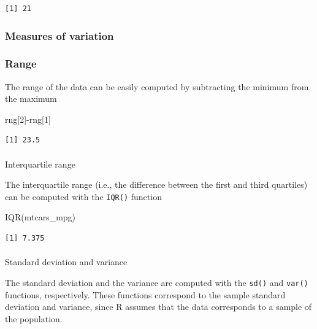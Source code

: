 \documentclass[
  letterpaper,
  DIV=11,
  numbers=noendperiod]{scrartcl}
\makeatletter
\let\oldparagraph\paragraph
\renewcommand{\paragraph}{
    \@ifstar
      \xxxParagraphStar
      \xxxParagraphNoStar
  }
\newcommand{\xxxParagraphStar}[1]{\oldparagraph*{#1}\mbox{}}
\newcommand{\xxxParagraphNoStar}[1]{\oldparagraph{#1}\mbox{}}
\newenvironment{Shaded}{\begin{snugshade}}{\end{snugshade}}
\newcommand{\DecValTok}[1]{\textcolor[rgb]{0.68,0.00,0.00}{#1}}
\newcommand{\FunctionTok}[1]{\textcolor[rgb]{0.28,0.35,0.67}{#1}}
\newcommand{\NormalTok}[1]{\textcolor[rgb]{0.00,0.23,0.31}{#1}}
\newcommand{\SpecialCharTok}[1]{\textcolor[rgb]{0.37,0.37,0.37}{#1}}
\makeatother
\begin{document}
\begin{verbatim}
[1] 21
\end{verbatim}

\subsubsection{Measures of variation}\label{measures-of-variation}

\subsubsection{Range}\label{range}

The range of the data can be easily computed by subtracting the minimum
from the maximum

\begin{Shaded}
\begin{Highlighting}[]
\NormalTok{rng[}\DecValTok{2}\NormalTok{]}\SpecialCharTok{{-}}\NormalTok{rng[}\DecValTok{1}\NormalTok{]}
\end{Highlighting}
\end{Shaded}

\begin{verbatim}
[1] 23.5
\end{verbatim}

\paragraph{Interquartile range}\label{interquartile-range}

The interquartile range (i.e., the difference between the first and
third quartiles) can be computed with the \texttt{IQR()} function

\begin{Shaded}
\begin{Highlighting}[]
\FunctionTok{IQR}\NormalTok{(mtcars\_mpg)}
\end{Highlighting}
\end{Shaded}

\begin{verbatim}
[1] 7.375
\end{verbatim}

\paragraph{Standard deviation and
variance}\label{standard-deviation-and-variance}

The standard deviation and the variance are computed with the
\texttt{sd()} and \texttt{var()} functions, respectively. These
functions correspond to the sample standard deviation and variance,
since R assumes that the data corresponds to a sample of the population.
\end{document}
